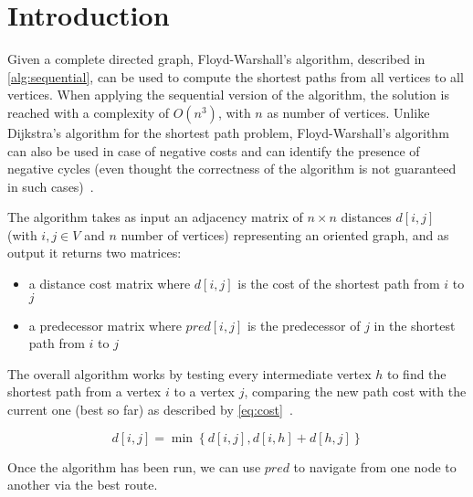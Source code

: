 \section{Introduction}\label{introduction}

Given a complete directed  graph, Floyd-Warshall's algorithm, described in \cref{alg:sequential}, can be used to compute the shortest paths from all vertices to all vertices.
When applying the sequential version of the algorithm, the solution is reached with a complexity of \(O(n^3)\), with \(n\) as number of vertices.
Unlike Dijkstra's algorithm for the shortest path problem, Floyd-Warshall's algorithm can also be used in case of negative costs and can identify the presence of negative cycles 
(even thought the correctness of the algorithm is not guaranteed in such cases)~\cite{fischetti}.

The algorithm takes as input an adjacency matrix of $n \times n$  distances $d[i,j]$ (with $i,j \in V$ and $n$ number of vertices) representing an oriented graph, and as output it returns two matrices:
\begin{itemize}
    \item a distance cost matrix where \(d[i,j]\) is the cost of the shortest path from \(i\) to \(j\)
    \item a predecessor matrix where \(pred[i,j]\) is the predecessor of \(j\) in the shortest path from \(i\) to \(j\)
  \end{itemize}

The overall algorithm works by testing every intermediate vertex \(h\) to find the shortest path from a vertex \(i\) to a vertex \(j\),
comparing the new path cost with the current one (best so far) as described by \cref{eq:cost}~\cite{fischetti}.

\begin{equation} \label{eq:cost}
    d[i,j] = \min\left\{ d[i,j], d[i,h]+d[h,j] \right\}
\end{equation}

Once the algorithm has been run, we can use \(pred\) to navigate from one node to another via the best route.

